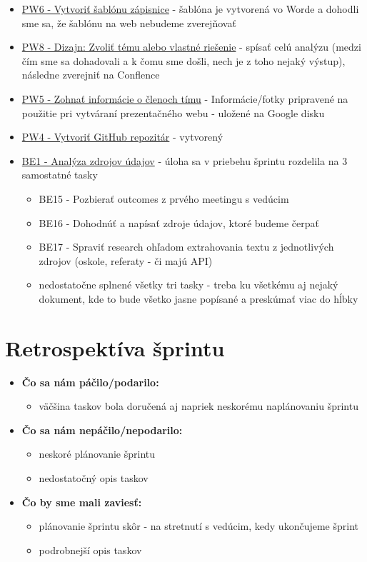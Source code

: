 \documentclass{article}
\begin{document}
    \begin{itemize}
        \item \underline {PW6 - Vytvoriť šablónu zápisnice} - šablóna je vytvorená vo Worde a dohodli sme sa, že šablónu na web nebudeme zverejňovať
        \item \underline {PW8 - Dizajn: Zvoliť tému alebo vlastné riešenie} - spísať celú analýzu (medzi čím sme sa dohadovali a k čomu sme došli, nech je z toho nejaký výstup), následne zverejniť na Conflence
        \item \underline {PW5 - Zohnať informácie o členoch tímu} - Informácie/fotky pripravené na použitie pri vytváraní prezentačného webu - uložené na Google disku
        \item \underline {PW4 - Vytvoriť GitHub repozitár} - vytvorený
        \item \underline {BE1 - Analýza zdrojov údajov} - úloha sa v priebehu šprintu rozdelila na 3 samostatné tasky
        \begin{itemize}
            \item BE15 - Pozbierať outcomes z prvého meetingu s vedúcim
            \item BE16 - Dohodnúť a napísať zdroje údajov, ktoré budeme čerpať
            \item BE17 - Spraviť research ohľadom extrahovania textu z jednotlivých zdrojov (oskole, referaty - či majú API)
            \item nedostatočne splnené všetky tri tasky - treba ku všetkému aj nejaký dokument, kde to bude všetko jasne popísané a preskúmať viac do hĺbky
        \end{itemize}
    \end{itemize}

    \section*{Retrospektíva šprintu}

    \begin{itemize}
    \item \textbf {Čo sa nám páčilo/podarilo:} 
        \begin{itemize}
            \item väčšina taskov bola doručená aj napriek neskorému naplánovaniu šprintu
        \end{itemize}
    \item \textbf {Čo sa nám nepáčilo/nepodarilo:}
        \begin{itemize}
            \item neskoré plánovanie šprintu
            \item nedostatočný opis taskov
        \end{itemize}
    \item \textbf {Čo by sme mali zaviesť:} 
        \begin{itemize}
            \item plánovanie šprintu skôr - na stretnutí s vedúcim, kedy ukončujeme šprint
            \item podrobnejší opis taskov
        \end{itemize}
    \end{itemize}
\end{document}

